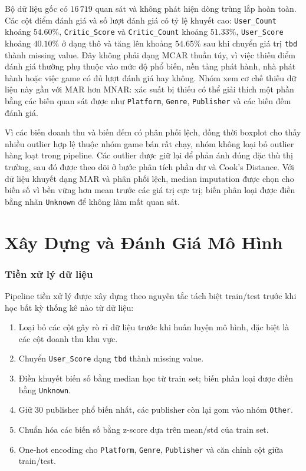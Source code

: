 \documentclass[12pt,a4paper]{article}
\begin{document}
Bộ dữ liệu gốc có $16\,719$ quan sát và không phát hiện dòng trùng lắp hoàn toàn. Các cột điểm đánh giá và số lượt đánh giá có tỷ lệ khuyết cao: \texttt{User\_Count} khoảng $54.60\%$, \texttt{Critic\_Score} và \texttt{Critic\_Count} khoảng $51.33\%$, \texttt{User\_Score} khoảng $40.10\%$ ở dạng thô và tăng lên khoảng $54.65\%$ sau khi chuyển giá trị \texttt{tbd} thành missing value. Đây không phải dạng MCAR thuần túy, vì việc thiếu điểm đánh giá thường phụ thuộc vào mức độ phổ biến, nền tảng phát hành, nhà phát hành hoặc việc game có đủ lượt đánh giá hay không. Nhóm xem cơ chế thiếu dữ liệu này gần với MAR hơn MNAR: xác suất bị thiếu có thể giải thích một phần bằng các biến quan sát được như \texttt{Platform}, \texttt{Genre}, \texttt{Publisher} và các biến đếm đánh giá.

Vì các biến doanh thu và biến đếm có phân phối lệch, đồng thời boxplot cho thấy nhiều outlier hợp lệ thuộc nhóm game bán rất chạy, nhóm không loại bỏ outlier hàng loạt trong pipeline. Các outlier được giữ lại để phản ánh đúng đặc thù thị trường, sau đó được theo dõi ở bước phân tích phần dư và Cook's Distance. Với dữ liệu khuyết dạng MAR và phân phối lệch, median imputation được chọn cho biến số vì bền vững hơn mean trước các giá trị cực trị; biến phân loại được điền bằng nhãn \texttt{Unknown} để không làm mất quan sát.

\part{Xây Dựng và Đánh Giá Mô Hình}

\section{Tiền xử lý dữ liệu}
Pipeline tiền xử lý được xây dựng theo nguyên tắc tách biệt train/test trước khi học bất kỳ thống kê nào từ dữ liệu:
\begin{enumerate}
    \item Loại bỏ các cột gây rò rỉ dữ liệu trước khi huấn luyện mô hình, đặc biệt là các cột doanh thu khu vực.
    \item Chuyển \texttt{User\_Score} dạng \texttt{tbd} thành missing value.
    \item Điền khuyết biến số bằng median học từ train set; biến phân loại được điền bằng \texttt{Unknown}.
    \item Giữ 30 publisher phổ biến nhất, các publisher còn lại gom vào nhóm \texttt{Other}.
    \item Chuẩn hóa các biến số bằng z-score dựa trên mean/std của train set.
    \item One-hot encoding cho \texttt{Platform}, \texttt{Genre}, \texttt{Publisher} và căn chỉnh cột giữa train/test.
\end{enumerate}
\end{document}

